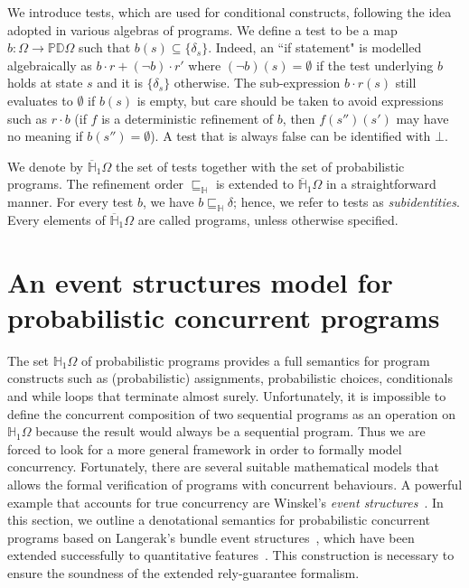 \documentclass[review]{elsart}
\newcommand{\D}{\mathbb{D}}
\renewcommand{\H}{\mathbb{H}}
\renewcommand{\P}{\mathbb{P}}
\newcommand{\Hip}{\overline{\mathbb{H}}_1}
\newcommand{\refbyh}{\sqsubseteq_{\mathbb{H}}}
\begin{document}
We introduce tests, which are used for conditional constructs, following the idea adopted in various algebras of programs. We define a test to be a map $b:\Omega\to\P\D\Omega$ such that $b(s) \subseteq\{\delta_s\}$. Indeed, an ``if statement" is modelled algebraically as $b{\cdot} r {+} (\neg b){\cdot} r'$ where $(\neg b)(s) = \emptyset$ if the test underlying $b$ holds at state $s$ and it is $\{\delta_s\}$ otherwise. The sub-expression $b{\cdot} r(s)$ still evaluates to $\emptyset$ if $b(s)$ is empty, but care should be taken to avoid expressions such as $r{\cdot} b$ (if $f$ is a deterministic refinement of $b$, then $f(s'')(s')$ may have no meaning if $b(s'') {=} \emptyset$). A test that is always false can be identified with $\bot$.

We denote by $\Hip\Omega$ the set of tests together with the set of probabilistic programs. The refinement order $\refbyh$ is extended to $\Hip\Omega$ in a straightforward manner. For every test $b$, we have $b\refbyh \delta$; hence, we refer to tests as \emph{subidentities}. Every elements of $\Hip\Omega$ are called programs, unless otherwise specified.





\section{An event structures model for probabilistic concurrent programs}\label{sec:es}

The set $\H_1\Omega$ of probabilistic programs provides a full semantics for program constructs such as (probabilistic) assignments, probabilistic choices, conditionals and while loops that terminate almost surely. Unfortunately, it is impossible to define the concurrent composition of two sequential programs as an operation on $\H_1\Omega$ because the result would always be a sequential program. Thus we are forced to look for a more general framework in order to formally model concurrency. Fortunately, there are several suitable mathematical models that allows the formal verification of programs with concurrent behaviours. A powerful example that accounts for true concurrency are Winskel's \emph{event structures}~\cite{Win80,Win86}. In this section, we outline a denotational semantics for probabilistic concurrent programs based on Langerak's bundle event structures~\cite{Lan92}, which have been extended successfully to quantitative features~\cite{Kat93,Kat96,Var03}. This construction is necessary to ensure the soundness of the extended rely-guarantee formalism.
\end{document}
